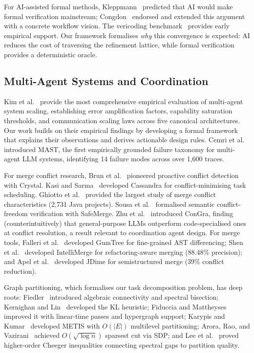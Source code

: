 \documentclass[11pt, a4paper, logo, copyright]{googledeepmind}
\begin{document}
For AI-assisted formal methods, Kleppmann~\citep{kleppmann2025formal} predicted
that AI would make formal verification mainstream;
Congdon~\citep{congdon2025formal} endorsed and extended this argument with a
concrete workflow vision.  The vericoding benchmark~\citep{vericoding2025}
provides early empirical support.  Our framework formalises \emph{why} this
convergence is expected: AI reduces the cost of traversing the refinement
lattice, while formal verification provides a deterministic oracle.


\subsection{Multi-Agent Systems and Coordination}

Kim et al.~\citep{kim2025scaling} provide the most comprehensive empirical
evaluation of multi-agent system scaling, establishing error amplification
factors, capability saturation thresholds, and communication scaling laws across
five canonical architectures.  Our work builds on their empirical findings by
developing a formal framework that explains their observations and derives
actionable design rules.  Cemri et al.~\citep{Cemri2025} introduced MAST, the
first empirically grounded failure taxonomy for multi-agent LLM systems,
identifying 14 failure modes across over 1,600 traces.

For merge conflict research, Brun et al.~\citep{Brun2011} pioneered proactive
conflict detection with Crystal.  Kasi and Sarma~\citep{KasiSarma2013}
developed Cassandra for conflict-minimising task scheduling.  Ghiotto
et al.~\citep{Ghiotto2018} provided the largest study of merge conflict
characteristics (2,731 Java projects).  Sousa et al.~\citep{Sousa2018}
formalised semantic conflict-freedom verification with SafeMerge.  Zhu
et al.~\citep{Zhu2024congra} introduced ConGra, finding (counterintuitively)
that general-purpose LLMs outperform code-specialised ones at conflict
resolution, a result relevant to coordination agent design.  For merge tools,
Falleri et al.~\citep{Falleri2014} developed GumTree for fine-grained AST
differencing; Shen et al.~\citep{Shen2019} developed IntelliMerge for
refactoring-aware merging (88.48\% precision); and Apel et al.~\citep{Apel2012}
developed JDime for semistructured merge (39\% conflict reduction).

Graph partitioning, which formalises our task decomposition problem, has deep
roots: Fiedler~\citep{Fiedler1973} introduced algebraic connectivity and
spectral bisection; Kernighan and Lin~\citep{KernighanLin1970} developed the KL
heuristic; Fiduccia and Mattheyses~\citep{FiducciaMattheyses1982} improved it
with linear-time passes and hypergraph support; Karypis and
Kumar~\citep{KarypisKumar1998} developed METIS with $O(|E|)$ multilevel
partitioning; Arora, Rao, and Vazirani~\citep{AroraRaoVazirani2009} achieved
$O(\sqrt{\log n})$ sparsest cut via SDP; and Lee et al.~\citep{Lee2012cheeger}
proved higher-order Cheeger inequalities connecting spectral gaps to partition
quality.
\end{document}
